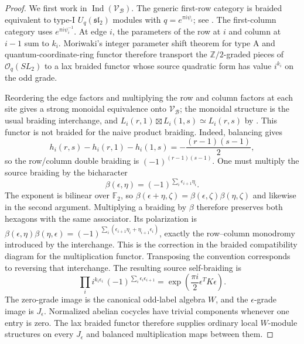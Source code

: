 \documentclass[11pt,a4paper]{article}
\numberwithin{equation}{section}
\theoremstyle{definition}\newtheorem{definition}[theorem]{Definition}
\theoremstyle{remark}\newtheorem{remark}[theorem]{Remark}
\newcommand{\Ind}{\operatorname{Ind}}\newcommand{\Irr}{\operatorname{Irr}}
\newcommand{\bo}{\boxtimes}\newcommand{\Cat}{\mathcal C}
\begin{document}
\begin{proof}
We first work in $\Ind(\mathscr V_{\mathcal B})$. The generic first-row category is
braided equivalent to type-I $U_q(\mathfrak{sl}_2)$ modules with
$q=e^{\pi i\psi_i}$; see \cite[Theorem 1.1, Theorems 5.10--5.11]{c:Koshida}.
The first-column category uses $e^{\pi i\psi_i^{-1}}$. At edge $i$, the
parameters of the row at $i$ and column at $i-1$ sum to $k_i$.
Moriwaki's integer parameter shift theorem for type A
\cite[Theorem 2.16]{c:Moriwaki} and quantum-coordinate-ring functor
\cite[Lemma 3.4, Proposition 3.5]{c:Moriwaki} therefore transport the
$\mathbb Z/2$-graded pieces of $\mathcal O_q(SL_2)$ to a lax braided
functor whose source quadratic form has value $i^{k_i}$ on the odd grade.

Reordering the edge factors and multiplying the row and column factors at
each site gives a strong monoidal equivalence onto $\mathscr V_{\mathcal B}$;
the monoidal structure is the usual braiding interchange, and
$L_i(r,1)\bo L_i(1,s)\simeq L_i(r,s)$ by
\cite[Theorem 5.2.5]{virasoro}. This functor is not braided for the naive
product braiding. Indeed, balancing gives
\[
 h_i(r,s)-h_i(r,1)-h_i(1,s)
       =-\frac{(r-1)(s-1)}2,
\]
so the row/column double braiding is $(-1)^{(r-1)(s-1)}$.
One must multiply the source braiding by the bicharacter
\[
 \beta(\epsilon,\eta)=(-1)^{\sum_i\epsilon_{i+1}\eta_i}.
\]
The exponent is bilinear over $\mathbb F_2$, so
$\beta(\epsilon+\eta,\zeta)=\beta(\epsilon,\zeta)\beta(\eta,\zeta)$
and likewise in the second argument. Multiplying a braiding by
$\beta$ therefore preserves both hexagons with the same associator.
Its polarization is
$\beta(\epsilon,\eta)\beta(\eta,\epsilon)
=(-1)^{\sum_i(\epsilon_{i+1}\eta_i+\eta_{i+1}\epsilon_i)}$,
exactly the row--column monodromy introduced by the interchange.
This is the correction in the braided compatibility diagram for
the multiplication functor. Transposing the convention corresponds
to reversing that interchange. The resulting source self-braiding is
\[
 \prod_i i^{k_i\epsilon_i}\,
        (-1)^{\sum_i\epsilon_i\epsilon_{i+1}}
       =\exp\left(\frac{\pi i}{2}\epsilon^TK\epsilon\right).
\]
The zero-grade image is the canonical odd-label algebra $W$, and the
$\epsilon$-grade image is $J_\epsilon$. Normalized abelian cocycles have
trivial components whenever one entry is zero. The lax braided functor
therefore supplies ordinary local $W$-module structures on every
$J_\epsilon$ and balanced multiplication maps between them.


\end{proof}
\end{document}
